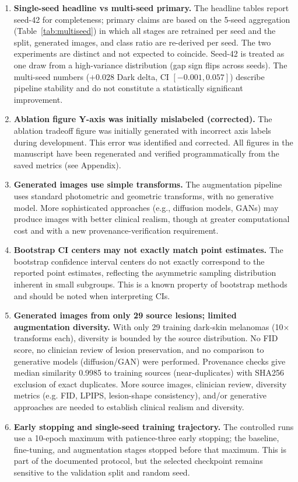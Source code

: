 \begin{enumerate}
    \item \textbf{Single-seed headline vs multi-seed primary.} The headline tables report seed-42 for completeness; primary claims are based on the 5-seed aggregation (Table~\ref{tab:multiseed}) in which all stages are retrained per seed and the split, generated images, and class ratio are re-derived per seed. The two experiments are distinct and not expected to coincide. Seed-42 is treated as one draw from a high-variance distribution (gap sign flips across seeds). The multi-seed numbers ($+0.028$ Dark delta, CI $[-0.001,0.057]$) describe pipeline stability and do not constitute a statistically significant improvement.

    \item \textbf{Ablation figure Y-axis was initially mislabeled (corrected).} The ablation tradeoff figure was initially generated with incorrect axis labels during development. This error was identified and corrected. All figures in the manuscript have been regenerated and verified programmatically from the saved metrics (see Appendix).

    \item \textbf{Generated images use simple transforms.} The augmentation pipeline uses standard photometric and geometric transforms, with no generative model. More sophisticated approaches (e.g., diffusion models, GANs) may produce images with better clinical realism, though at greater computational cost and with a new provenance-verification requirement.

    \item \textbf{Bootstrap CI centers may not exactly match point estimates.} The bootstrap confidence interval centers do not exactly correspond to the reported point estimates, reflecting the asymmetric sampling distribution inherent in small subgroups. This is a known property of bootstrap methods and should be noted when interpreting CIs.

    \item \textbf{Generated images from only 29 source lesions; limited augmentation diversity.} With only 29 training dark-skin melanomas (10$\times$ transforms each), diversity is bounded by the source distribution. No FID score, no clinician review of lesion preservation, and no comparison to generative models (diffusion/GAN) were performed. Provenance checks give median similarity 0.9985 to training sources (near-duplicates) with SHA256 exclusion of exact duplicates. More source images, clinician review, diversity metrics (e.g. FID, LPIPS, lesion-shape consistency), and/or generative approaches are needed to establish clinical realism and diversity.

    \item \textbf{Early stopping and single-seed training trajectory.} The controlled runs use a 10-epoch maximum with patience-three early stopping; the baseline, fine-tuning, and augmentation stages stopped before that maximum. This is part of the documented protocol, but the selected checkpoint remains sensitive to the validation split and random seed.
\end{enumerate}

